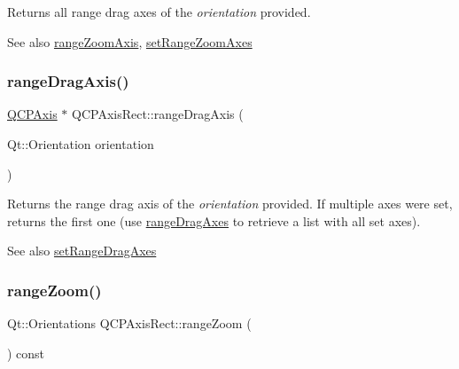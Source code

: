 Returns all range drag axes of the {\itshape orientation} provided.

\begin{DoxySeeAlso}{See also}
\mbox{\hyperlink{class_q_c_p_axis_rect_a679c63f2b8daccfe6ec5110dce3dd3b6}{range\+Zoom\+Axis}}, \mbox{\hyperlink{class_q_c_p_axis_rect_a9442cca2aa358405f39a64d51eca13d2}{set\+Range\+Zoom\+Axes}} 
\end{DoxySeeAlso}
\mbox{\label{class_q_c_p_axis_rect_a6d7c22cfc54fac7a3d6ef80b133a8574}} 
\subsubsection{\texorpdfstring{rangeDragAxis()}{rangeDragAxis()}}
{\footnotesize\ttfamily \mbox{\hyperlink{class_q_c_p_axis}{Q\+C\+P\+Axis}} $\ast$ Q\+C\+P\+Axis\+Rect\+::range\+Drag\+Axis (\begin{DoxyParamCaption}\item[{Qt\+::\+Orientation}]{orientation }\end{DoxyParamCaption})}

Returns the range drag axis of the {\itshape orientation} provided. If multiple axes were set, returns the first one (use \mbox{\hyperlink{class_q_c_p_axis_rect_aae5f99a044ca911685a306f01b7ff941}{range\+Drag\+Axes}} to retrieve a list with all set axes).

\begin{DoxySeeAlso}{See also}
\mbox{\hyperlink{class_q_c_p_axis_rect_a648cce336bd99daac4a5ca3e5743775d}{set\+Range\+Drag\+Axes}} 
\end{DoxySeeAlso}
\mbox{\label{class_q_c_p_axis_rect_aa0d8414ef040523f8b2d55f0c0bddbee}} 
\subsubsection{\texorpdfstring{rangeZoom()}{rangeZoom()}}
{\footnotesize\ttfamily Qt\+::\+Orientations Q\+C\+P\+Axis\+Rect\+::range\+Zoom (\begin{DoxyParamCaption}{ }\end{DoxyParamCaption}) const\hspace{0.3cm}{\ttfamily [inline]}}

